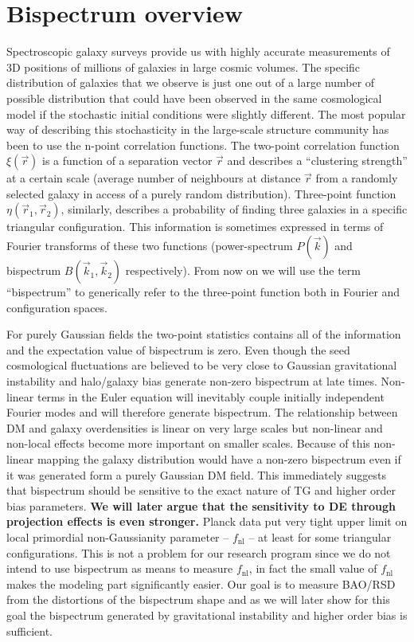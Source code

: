 
\section{Bispectrum overview}

Spectroscopic galaxy surveys provide us with highly accurate measurements of 3D
positions of millions of galaxies in large cosmic volumes.  The specific
distribution of galaxies that we observe is just one out of a large number of
possible distribution that could have been observed in the same cosmological
model if the stochastic initial conditions were slightly different. The most
popular way of describing this stochasticity in the large-scale structure
community has been to use the n-point correlation functions.  The two-point
correlation function $\xi(\vec{r})$ is a function of a separation vector
$\vec{r}$ and describes a ``clustering strength'' at a certain scale (average
number of neighbours at distance $\vec{r}$ from a randomly selected galaxy in
access of a purely random distribution).  Three-point function $\eta(\vec{r}_1,
\vec{r}_2)$, similarly, describes a probability of finding three galaxies  in a
specific triangular configuration.  This information is sometimes expressed in
terms of Fourier transforms of these two functions  (power-spectrum
$P(\vec{k})$ and bispectrum $B(\vec{k}_1, \vec{k}_2)$ respectively). From now
on we will use the term ``bispectrum'' to generically refer to the three-point
function both in Fourier and configuration spaces. 

For purely Gaussian fields the two-point statistics contains all of the
information and the expectation value of bispectrum is zero.  Even though the seed
cosmological fluctuations are believed to be very close to Gaussian
gravitational instability and halo/galaxy bias generate non-zero bispectrum at
late times. Non-linear terms in the Euler equation will inevitably
couple initially independent Fourier modes and will therefore generate
bispectrum. The relationship between DM and galaxy overdensities  is linear
on very large scales but non-linear and non-local effects become more important
on smaller scales. Because of this non-linear mapping the galaxy distribution
would have a non-zero bispectrum even if it was generated form a purely
Gaussian DM field. This immediately suggests that bispectrum should be
sensitive to the exact nature of TG and higher order bias parameters.
\textbf{We will later argue that the sensitivity to DE  through projection
effects is even stronger.} Planck data put very tight upper limit on local
primordial non-Gaussianity parameter -- $f_\mathrm{nl}$ -- at least for some
triangular configurations. This is not a problem for our research program since
we do not intend to use bispectrum as means to measure $f_\mathrm{nl}$, in fact
the small value of $f_\mathrm{nl}$ makes the modeling part significantly
easier. Our goal is to measure BAO/RSD from the distortions of the bispectrum
shape and as we will later show for this goal the bispectrum generated by
gravitational instability and higher order bias is sufficient.

